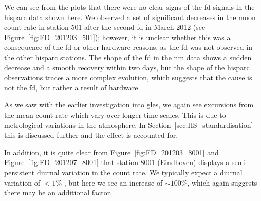 We can see from the plots that there were no clear signs of the \gls{fd} signals in the \gls{hisparc} data shown here. We observed a set of significant decreases in the muon count rate in station 501 after the second \gls{fd} in March 2012 (see Figure~\ref{fig:FD_201203_501}); however, it is unclear whether this was a consequence of the \gls{fd} or other hardware reasons, as the \gls{fd} was not observed in the other \gls{hisparc} stations. The shape of the \gls{fd} in the \gls{nm} data shows a sudden decrease and a smooth recovery within two days, but the shape of the \gls{hisparc} observations traces a more complex evolution, which suggests that the cause is not the \gls{fd}, but rather a result of hardware.

As we saw with the earlier investigation into \glspl{gle}, we again see excursions from the mean count rate which vary over longer time scales. This is due to metrological variations in the atmosphere. In Section~\ref{sec:HS_standardisation} this is discussed further and the effect is accounted for.

In addition, it is quite clear from Figure~\ref{fig:FD_201203_8001} and Figure~\ref{fig:FD_201207_8001} that station 8001 (Eindhoven) displays a semi-persistent diurnal variation in the count rate. We typically expect a diurnal variation of $<1\%$ \citep{mishra_study_2007, mishra_cosmic_2008, dubey_cosmic_2016, thomas_decadal_2017}, but here we see an increase of $\sim 100\%$, which again suggests there may be an additional factor.%



